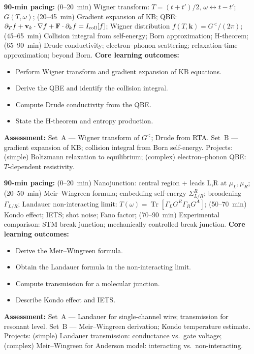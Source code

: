 \documentclass[11pt,a4paper]{article}
\begin{document}
\medskip

\begin{tcolorbox}[modulebox, title={Module~II.5 --- Lecture L07: Quantum Boltzmann Equation}]
\textbf{90-min pacing:} (0--20~min) Wigner transform: $T=(t+t')/2$, $\omega\leftrightarrow t-t'$; $G(T,\omega)$; (20--45~min) Gradient expansion of KB; QBE: $\partial_T f+\mathbf{v}_k\cdot\nabla f+\mathbf{F}\cdot\partial_k f=I_{\rm coll}[f]$; Wigner distribution $f(T,\mathbf{k})=G^</(2\pi)$; (45--65~min) Collision integral from self-energy; Born approximation; H-theorem; (65--90~min) Drude conductivity; electron--phonon scattering; relaxation-time approximation; beyond Born.
\medskip\textbf{Core learning outcomes:}
\begin{itemize}[leftmargin=1.4em,topsep=2pt,itemsep=1pt]
  \item Perform Wigner transform and gradient expansion of KB equations.
  \item Derive the QBE and identify the collision integral.
  \item Compute Drude conductivity from the QBE.
  \item State the H-theorem and entropy production.
\end{itemize}
\medskip\textbf{Assessment:}
Set~A --- Wigner transform of $G^<$; Drude from RTA.
Set~B --- gradient expansion of KB; collision integral from Born self-energy.
Projects: (simple) Boltzmann relaxation to equilibrium; (complex) electron--phonon QBE: $T$-dependent resistivity.
\end{tcolorbox}

\medskip

\begin{tcolorbox}[modulebox, title={Module~II.5 --- Lecture L08: Steady-State Transport}]
\textbf{90-min pacing:} (0--20~min) Nanojunction: central region + leads L,R at $\mu_L,\mu_R$; (20--50~min) Meir--Wingreen formula; embedding self-energy $\Sigma^R_{L/R}$; broadening $\Gamma_{L/R}$; Landauer non-interacting limit: $T(\omega)=\operatorname{Tr}[\Gamma_L G^R\Gamma_R G^A]$; (50--70~min) Kondo effect; IETS; shot noise; Fano factor; (70--90~min) Experimental comparison: STM break junction; mechanically controlled break junction.
\medskip\textbf{Core learning outcomes:}
\begin{itemize}[leftmargin=1.4em,topsep=2pt,itemsep=1pt]
  \item Derive the Meir--Wingreen formula.
  \item Obtain the Landauer formula in the non-interacting limit.
  \item Compute transmission for a molecular junction.
  \item Describe Kondo effect and IETS.
\end{itemize}
\medskip\textbf{Assessment:}
Set~A --- Landauer for single-channel wire; transmission for resonant level.
Set~B --- Meir--Wingreen derivation; Kondo temperature estimate.
Projects: (simple) Landauer transmission: conductance vs.\ gate voltage; (complex) Meir--Wingreen for Anderson model: interacting vs.\ non-interacting.
\end{tcolorbox}
\end{document}
